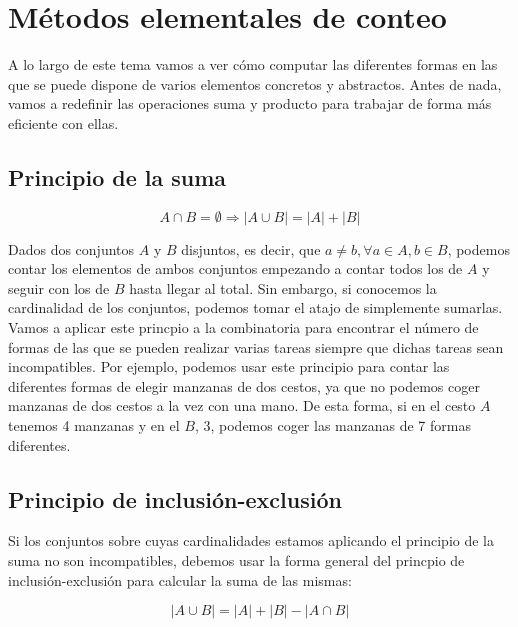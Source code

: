 \section{Métodos elementales de conteo}\label{metodos-elementales-de-conteo}

A lo largo de este tema vamos a ver cómo computar las diferentes formas en las que se puede dispone de varios elementos concretos y abstractos.
Antes de nada, vamos a redefinir las operaciones suma y producto para trabajar de forma más eficiente con ellas.

\subsection{Principio de la suma}\label{principio-de-la-suma}

\[A \cap B = \emptyset \Rightarrow |A \cup B| = |A| + |B|\]

Dados dos conjuntos $A$ y $B$ disjuntos, es decir, que $a \neq b, \forall a \in A, b \in B$, podemos contar los elementos de ambos conjuntos empezando a contar todos los de $A$ y seguir con los de $B$ hasta llegar al total.
Sin embargo, si conocemos la cardinalidad de los conjuntos, podemos tomar el atajo de simplemente sumarlas.
Vamos a aplicar este princpio a la combinatoria para encontrar el número de formas de las que se pueden realizar varias tareas siempre que dichas tareas sean incompatibles.
Por ejemplo, podemos usar este principio para contar las diferentes formas de elegir manzanas de dos cestos, ya que no podemos coger manzanas de dos cestos a la vez con una mano.
De esta forma, si en el cesto $A$ tenemos 4 manzanas y en el $B$, 3, podemos coger las manzanas de 7 formas diferentes.

\subsection{Principio de inclusión-exclusión}\label{principio-de-inclusion-exclusion}

Si los conjuntos sobre cuyas cardinalidades estamos aplicando el principio de la suma no son incompatibles, debemos usar la forma general del princpio de inclusión-exclusión para calcular la suma de las mismas:

\[|A \cup B| = |A| + |B| - |A \cap B|\]

